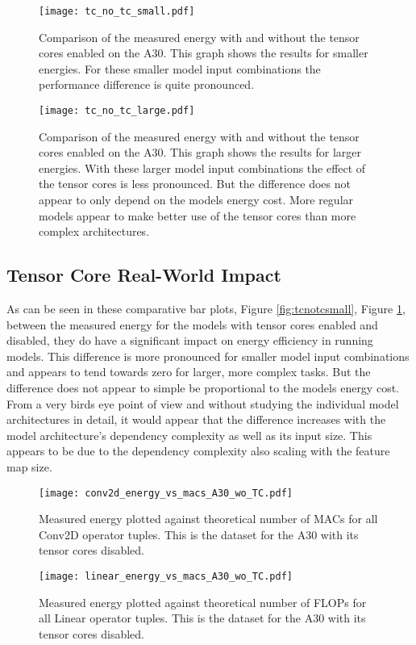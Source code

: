 \documentclass[conference]{IEEEtran}
\begin{document}
\begin{figure}
    \texttt{[image: tc\_no\_tc\_small.pdf]}
    \caption{Comparison of the measured energy with and without the tensor cores enabled on the A30. This graph shows the results for smaller energies. For these smaller model input combinations the performance difference is quite pronounced.}
    \label{fig:tcnotcsmall}
    \texttt{[image: tc\_no\_tc\_large.pdf]}
    \caption{Comparison of the measured energy with and without the tensor cores enabled on the A30. This graph shows the results for larger energies. With these larger model input combinations the effect of the tensor cores is less pronounced. But the difference does not appear to only depend on the models energy cost. More regular models appear to make better use of the tensor cores than more complex architectures.}
    \label{fig:tcnotclarge}
\end{figure}


\subsection{Tensor Core Real-World Impact}
As can be seen in these comparative bar plots, Figure \ref{fig:tcnotcsmall}, Figure \ref{fig:tcnotclarge}, between the measured energy for the models with tensor cores enabled and disabled, they do have a significant impact on energy efficiency in running models. This difference is more pronounced for smaller model input combinations and appears to tend towards zero for larger, more complex tasks. But the difference does not appear to simple be proportional to the models energy cost. From a very birds eye point of view and without studying the individual model architectures in detail, it would appear that the difference increases with the model architecture's dependency complexity as well as its input size. This appears to be due to the dependency complexity also scaling with the feature map size.

\begin{figure}
    \texttt{[image: conv2d\_energy\_vs\_macs\_A30\_wo\_TC.pdf]}
    \caption{Measured energy plotted against theoretical number of MACs for all Conv2D operator tuples. This is the dataset for the A30 with its tensor cores disabled.}
    \label{fig:conv2da30notc}
    \texttt{[image: linear\_energy\_vs\_macs\_A30\_wo\_TC.pdf]}
    \caption{Measured energy plotted against theoretical number of FLOPs for all Linear operator tuples. This is the dataset for the A30 with its tensor cores disabled.}
    \label{fig:lina30notc}
\end{figure}
\end{document}
